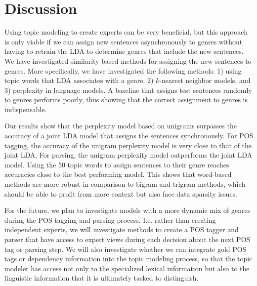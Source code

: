 \section{Discussion} \label{conc}

Using topic modeling to create experts can be very beneficial, but this approach is only viable if we can assign new sentences asynchronously to genres without having to retrain the LDA to determine genres that include the new sentences. We have investigated similarity based methods for assigning the new sentences to genres.
More specifically, we have  investigated the following methods:  1) using topic words that LDA associates with a genre, 2) $k$-nearest neighbor models, and 3) perplexity in language models. A baseline that assigns test sentences randomly to genres performs poorly, thus showing that the correct assignment to genres is indispensable.

Our results show that the perplexity model  based on unigrams surpasses the accuracy of a joint LDA model that assigns the sentences synchronously.  For POS tagging, the  accuracy of the unigram perplexity model is very close to that of the joint LDA.  For parsing, the unigram perplexity model outperforms the joint LDA model.  Using the 50 topic words to assign sentences to their genre reaches accuracies close to the best performing model. This shows that word-based methods are more robust in comparison to bigram and trigram methods, which should be able to profit from more context but also face data sparsity issues.

For the future, we plan to investigate models with a more dynamic mix of genres during the POS tagging and parsing process. I.e. rather than creating independent experts, we will investigate methods to create a POS tagger and parser that have access to expert views during each decision about the next POS tag or parsing step. We will also investigate whether we can integrate gold POS tags or dependency information into the topic modeling process, so that the topic modeler has access not only to the specialized lexical information but also to the linguistic information that it is ultimately tasked to distinguish. 
